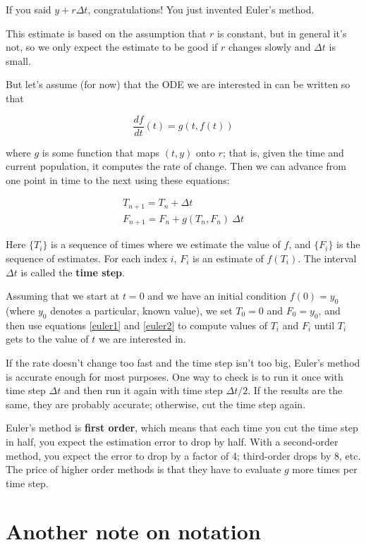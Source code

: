 \documentclass{book}
\begin{document}
If you said $y + r \Delta t$, congratulations!  You just invented
Euler's method.

This estimate is based on the assumption that $r$ is constant, but
in general it's not, so we only expect the estimate to be good if
$r$ changes slowly and $\Delta t$ is small.

But let's assume (for now) that the ODE we are interested in can
be written so that

\begin{equation}\label{eq:g_ODE}
\frac{df}{dt}(t) = g(t, f(t))
\end{equation}

where $g$ is some function that maps $(t, y)$ onto $r$;
that is, given the time and current population, it computes the rate
of change.  Then we can advance from one point in time to the
next using these equations:

\begin{eqnarray}
\label{euler1}
T_{n+1} = T_n + \Delta t           \\
\label{euler2}
F_{n+1} = F_n + g(T_n,F_n)~\Delta t
\end{eqnarray}

Here $\{T_i\}$ is a sequence of times where we estimate the value
of $f$, and $\{F_i\}$ is the sequence of estimates.  For each
index $i$, $F_i$ is an estimate of $f(T_i)$.
The interval $\Delta t$ is called the {\bf time step}.

Assuming that we start at $t=0$ and we have an initial condition $f(0)
= y_0$ (where $y_0$ denotes a particular, known value), we set
$T_0 = 0$ and $F_0 = y_0$, and then use
equations \eqref{euler1} and \eqref{euler2} to
compute values of $T_i$ and $F_i$ until $T_i$
gets to the value of $t$ we are interested in.

If the rate doesn't change too fast and the time step isn't
too big, Euler's method is accurate enough for most purposes.  One
way to check is to run it once with time step $\Delta t$ and then run it
again with time step $\Delta t/2$.  If the results are the same, they are
probably accurate; otherwise, cut the time step again.

Euler's method is {\bf first order}, which means that each time you
cut the time step in half, you expect the estimation error to drop by
half.  With a second-order method, you expect the error to drop by a
factor of 4; third-order drops by 8, etc.  The price of higher order
methods is that they have to evaluate $g$ more times per time step.


\section{Another note on notation}
\end{document}
